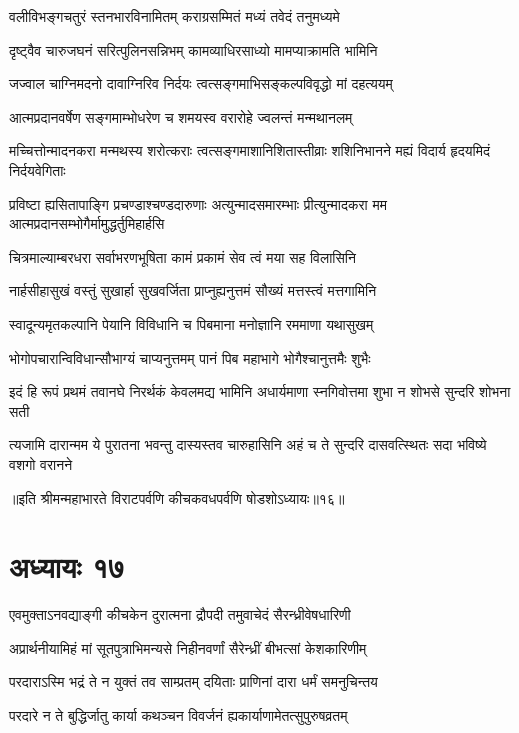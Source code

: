 \twolineshloka
{वलीविभङ्गचतुरं स्तनभारविनामितम्}
{कराग्रसम्मितं मध्यं तवेदं तनुमध्यमे}


\twolineshloka
{दृष्ट्वैव चारुजघनं सरित्पुलिनसन्निभम्}
{कामव्याधिरसाध्यो मामप्याक्रामति भामिनि}


\twolineshloka
{जज्वाल चाग्निमदनो दावाग्निरिव निर्दयः}
{त्वत्सङ्गमाभिसङ्कल्पविवृद्धो मां दहत्ययम्}


\twolineshloka
{आत्मप्रदानवर्षेण सङ्गमाम्भोधरेण च}
{शमयस्व वरारोहे ज्वलन्तं मन्मथानलम्}


\threelineshloka
{मच्चित्तोन्मादनकरा मन्मथस्य शरोत्कराः}
{त्वत्सङ्गमाशानिशितास्तीव्राः शशिनिभानने}
{मह्यं विदार्य हृदयमिदं निर्दयवेगिताः}


\threelineshloka
{प्रविष्टा ह्यसितापाङ्गि प्रचण्डाश्चण्डदारुणाः}
{अत्युन्मादसमारम्भाः प्रीत्युन्मादकरा मम}
{आत्मप्रदानसम्भोगैर्मामुद्धर्तुमिहार्हसि}


\twolineshloka
{चित्रमाल्याम्बरधरा सर्वाभरणभूषिता}
{कामं प्रकामं सेव त्वं मया सह विलासिनि}


\twolineshloka
{नार्हसीहासुखं वस्तुं सुखार्हा सुखवर्जिता}
{प्राप्नुह्यनुत्तमं सौख्यं मत्तस्त्वं मत्तगामिनि}


\twolineshloka
{स्वादून्यमृतकल्पानि पेयानि विविधानि च}
{पिबमाना मनोज्ञानि रममाणा यथासुखम्}


\twolineshloka
{भोगोपचारान्विविधान्सौभाग्यं चाप्यनुत्तमम्}
{पानं पिब महाभागे भोगैश्चानुत्तमैः शुभैः}


\twolineshloka
{इदं हि रूपं प्रथमं तवानघे निरर्थकं केवलमद्य भामिनि}
{अधार्यमाणा स्नगिवोत्तमा शुभा न शोभसे सुन्दरि शोभना सती}


\twolineshloka
{त्यजामि दारान्मम ये पुरातना भवन्तु दास्यस्तव चारुहासिनि}
{अहं च ते सुन्दरि दासवत्स्थितः सदा भविष्ये वशगो वरानने}

॥इति श्रीमन्महाभारते विराटपर्वणि कीचकवधपर्वणि षोडशोऽध्यायः॥१६॥

\chapter{अध्यायः १७}

\twolineshloka
{एवमुक्ताऽनवद्याङ्गी कीचकेन दुरात्मना}
{द्रौपदी तमुवाचेदं सैरन्ध्रीवेषधारिणी}


\twolineshloka
{अप्रार्थनीयामिहं मां सूतपुत्राभिमन्यसे}
{निहीनवर्णां सैरेन्ध्रीं बीभत्सां केशकारिणीम्}


\twolineshloka
{परदाराऽस्मि भद्रं ते न युक्तं तव साम्प्रतम्}
{दयिताः प्राणिनां दारा धर्मं समनुचिन्तय}


\twolineshloka
{परदारे न ते बुद्धिर्जातु कार्या कथञ्चन}
{विवर्जनं ह्यकार्याणामेतत्सुपुरुषव्रतम्}


